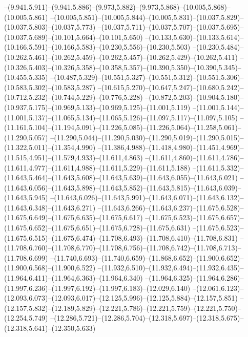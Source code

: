   --(9.941,5.911)--(9.941,5.886)--(9.973,5.882)--(9.973,5.868)--(10.005,5.868)--(10.005,5.861)%
  --(10.005,5.851)--(10.005,5.844)--(10.005,5.831)--(10.037,5.829)--(10.037,5.803)--(10.037,5.773)%
  --(10.037,5.711)--(10.037,5.707)--(10.037,5.695)--(10.037,5.689)--(10.101,5.664)--(10.101,5.650)%
  --(10.133,5.630)--(10.133,5.614)--(10.166,5.591)--(10.166,5.583)--(10.230,5.556)--(10.230,5.503)%
  --(10.230,5.484)--(10.262,5.461)--(10.262,5.459)--(10.262,5.457)--(10.262,5.429)--(10.262,5.411)%
  --(10.326,5.403)--(10.326,5.358)--(10.358,5.357)--(10.390,5.350)--(10.390,5.345)--(10.455,5.335)%
  --(10.487,5.329)--(10.551,5.327)--(10.551,5.312)--(10.551,5.306)--(10.583,5.302)--(10.583,5.287)%
  --(10.615,5.270)--(10.647,5.247)--(10.680,5.242)--(10.712,5.232)--(10.744,5.229)--(10.776,5.228)%
  --(10.872,5.203)--(10.904,5.180)--(10.937,5.175)--(10.969,5.133)--(10.969,5.125)--(11.001,5.119)%
  --(11.001,5.144)--(11.001,5.137)--(11.065,5.134)--(11.065,5.126)--(11.097,5.117)--(11.097,5.105)%
  --(11.161,5.104)--(11.194,5.091)--(11.226,5.085)--(11.226,5.064)--(11.258,5.061)--(11.290,5.057)%
  --(11.290,5.044)--(11.290,5.030)--(11.290,5.019)--(11.290,5.015)--(11.322,5.011)--(11.354,4.990)%
  --(11.386,4.988)--(11.418,4.980)--(11.451,4.969)--(11.515,4.951)--(11.579,4.933)--(11.611,4.863)%
  --(11.611,4.860)--(11.611,4.786)--(11.611,4.977)--(11.611,4.988)--(11.611,5.229)--(11.611,5.188)%
  --(11.611,5.332)--(11.643,5.464)--(11.643,5.608)--(11.643,5.639)--(11.643,6.055)--(11.643,6.021)%
  --(11.643,6.056)--(11.643,5.898)--(11.643,5.852)--(11.643,5.815)--(11.643,6.039)--(11.643,5.945)%
  --(11.643,6.026)--(11.643,5.991)--(11.643,6.071)--(11.643,6.132)--(11.643,6.348)--(11.643,6.271)%
  --(11.643,6.266)--(11.643,6.237)--(11.675,6.528)--(11.675,6.649)--(11.675,6.635)--(11.675,6.617)%
  --(11.675,6.523)--(11.675,6.657)--(11.675,6.652)--(11.675,6.651)--(11.675,6.728)--(11.675,6.631)%
  --(11.675,6.523)--(11.675,6.515)--(11.675,6.474)--(11.708,6.493)--(11.708,6.410)--(11.708,6.831)%
  --(11.708,6.760)--(11.708,6.770)--(11.708,6.756)--(11.708,6.742)--(11.708,6.713)--(11.708,6.699)%
  --(11.740,6.693)--(11.740,6.659)--(11.868,6.652)--(11.900,6.652)--(11.900,6.568)--(11.900,6.522)%
  --(11.932,6.510)--(11.932,6.494)--(11.932,6.435)--(11.964,6.411)--(11.964,6.363)--(11.964,6.340)%
  --(11.964,6.325)--(11.964,6.286)--(11.997,6.236)--(11.997,6.192)--(11.997,6.183)--(12.029,6.140)%
  --(12.061,6.123)--(12.093,6.073)--(12.093,6.017)--(12.125,5.996)--(12.125,5.884)--(12.157,5.851)%
  --(12.157,5.832)--(12.189,5.829)--(12.221,5.786)--(12.221,5.759)--(12.221,5.750)--(12.254,5.749)%
  --(12.286,5.721)--(12.286,5.704)--(12.318,5.697)--(12.318,5.675)--(12.318,5.641)--(12.350,5.633)%
